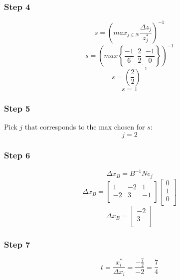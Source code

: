 \documentclass[14pt]{extarticle}
\begin{document}
\subsubsection*{Step 4}
\[
    s = \left(max_{j \in N} \frac{\Delta z_j}{z^*_j}\right)^{-1}
\]
\[
    s = \left(max \left\{ \frac{-1}{6}_{\textstyle,}\ \frac{2}{2}_{\textstyle,}\ \frac{-1}{0} \right\} \right)^{-1}
\]
\[
    s = \left(\frac{2}{2}\right)^{-1}
\]
\[
    s = 1
\]

\subsubsection*{Step 5}
Pick $j$ that corresponds to the max chosen for $s$:
\[
    j = 2
\]

\subsubsection*{Step 6}
\[
    \Delta x_B = B^{-1}N e_j
\]
\[
    \Delta x_B =
    \begin{bmatrix}
        1 & -2 & 1 \\
        -2 & 3 & -1 \\
    \end{bmatrix}
    \begin{bmatrix}
        0 \\
        1 \\
        0 \\
    \end{bmatrix}
\]
\[
    \Delta x_B =
    \begin{bmatrix}
        -2 \\
        3 \\
    \end{bmatrix}
\]

\subsubsection*{Step 7}
\[
    t = \frac{x^*_i}{\Delta x_i} = \frac{-\frac{7}{2}}{-2} = \frac{7}{4}
\]
\end{document}
